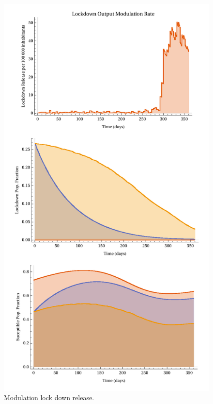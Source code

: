 \begin{figure}[tbh]
    \centering
    \includegraphics[width=1.0\linewidth]{figs/LockdownEffect}
    \caption{Modulation lock down release.}
    \label{fig:lockdowneffect}
\end{figure}
